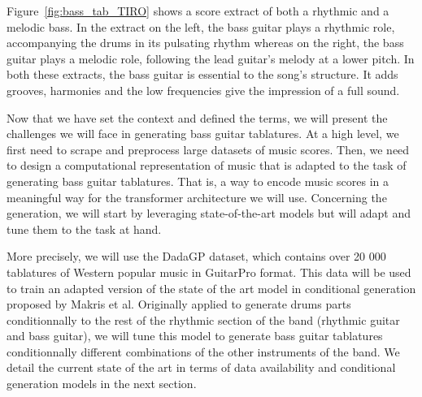 Figure~\ref{fig:bass_tab_TIRO} shows a score extract of both a rhythmic and a melodic bass.
In the extract on the left, the bass guitar plays a rhythmic role, accompanying the drums in its pulsating rhythm 
whereas on the right, the bass guitar plays a melodic role, following the lead guitar's melody at a lower pitch.
In both these extracts, the bass guitar is essential to the song's structure.
It adds grooves, harmonies and the low frequencies give the impression of a full sound.

Now that we have set the context and defined the terms, we will present the challenges we will face in generating bass guitar tablatures.
At a high level, we first need to scrape and preprocess large datasets of music scores.
Then, we need to design a computational representation of music that is adapted to the task of generating bass guitar tablatures.
That is, a way to encode music scores in a meaningful way for the transformer architecture we will use.
Concerning the generation, we will start by leveraging state-of-the-art models but will adapt and tune them to the task at hand.

More precisely, we will use the DadaGP dataset, which contains over 20 000 tablatures of Western popular music in GuitarPro format.
This data will be used to train an adapted version of the state of the art model in conditional generation proposed by Makris et al.
Originally applied to generate drums parts conditionnally to the rest of the rhythmic section of the band (rhythmic guitar and bass guitar),
we will tune this model to generate bass guitar tablatures conditionnally different combinations of the other instruments of the band.
We detail the current state of the art in terms of data availability and conditional generation models in the next section.